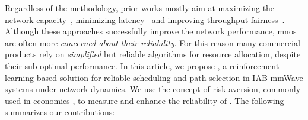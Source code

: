 Regardless of the methodology,  prior works mostly aim at maximizing the network capacity~\cite{pan2017joint, alizadeh2019load, huang2015joint, nguyen2020nonsmooth, rasekh2015interference, kwon2019joint, pizzo2017optimal, kulkarni2018max}, minimizing latency~\cite{vu2018path, ortiz2019scaros} and improving throughput fairness~\cite{alizadeh2019load, pagin2022}. Although these approaches successfully improve the network performance, \glspl{mno} are often more \textit{concerned about their reliability}. 
For this reason many commercial products rely on \textit{simplified} but reliable algorithms for resource allocation, despite their sub-optimal performance. 
In this article, we propose \name{}, a reinforcement learning-based solution for reliable scheduling and path selection in IAB mmWave systems under network dynamics. We use the concept of risk aversion, commonly used in economics \cite{Rockafellar2000, Levy1998}, to measure and enhance the reliability of \name{}. The following summarizes our contributions: 

